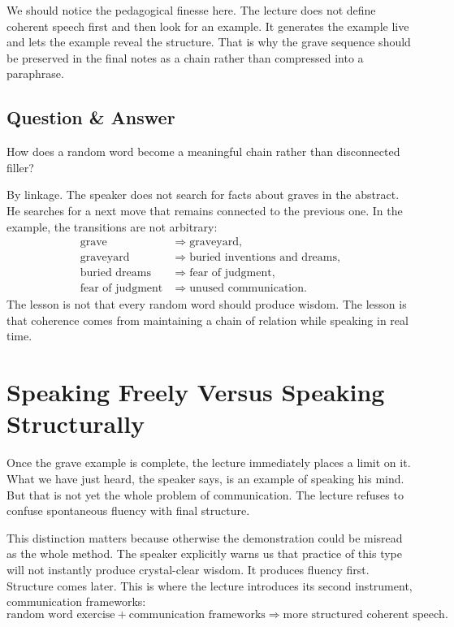 We should notice the pedagogical finesse here. The lecture does not define coherent speech first and then look for an example. It generates the example live and lets the example reveal the structure. That is why the grave sequence should be preserved in the final notes as a chain rather than compressed into a paraphrase.

\subsection{Question \& Answer}

How does a random word become a meaningful chain rather than disconnected filler?

By linkage. The speaker does not search for facts about graves in the abstract. He searches for a next move that remains connected to the previous one. In the example, the transitions are not arbitrary:
\begin{align}
\text{grave} &\Longrightarrow \text{graveyard},\\
\text{graveyard} &\Longrightarrow \text{buried inventions and dreams},\\
\text{buried dreams} &\Longrightarrow \text{fear of judgment},\\
\text{fear of judgment} &\Longrightarrow \text{unused communication}.
\end{align}
The lesson is not that every random word should produce wisdom. The lesson is that coherence comes from maintaining a chain of relation while speaking in real time.

\section{Speaking Freely Versus Speaking Structurally}

Once the grave example is complete, the lecture immediately places a limit on it. What we have just heard, the speaker says, is an example of speaking his mind. But that is not yet the whole problem of communication. The lecture refuses to confuse spontaneous fluency with final structure.

This distinction matters because otherwise the demonstration could be misread as the whole method. The speaker explicitly warns us that practice of this type will not instantly produce crystal-clear wisdom. It produces fluency first. Structure comes later. This is where the lecture introduces its second instrument, communication frameworks:
\begin{equation}
\text{random word exercise} + \text{communication frameworks} \Longrightarrow \text{more structured coherent speech}.
\end{equation}

